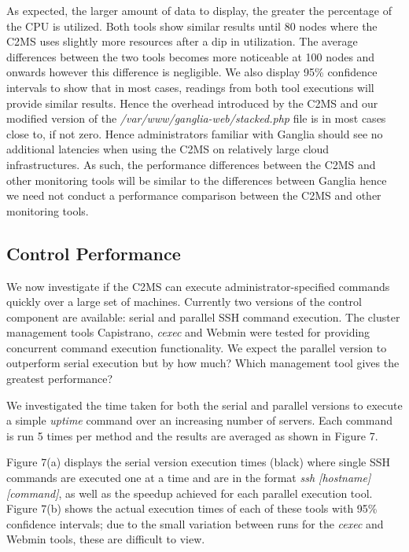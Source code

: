 \documentclass[10pt, conference, compsocconf]{IEEEtran}
\begin{document}
As expected, the larger amount of data to display, the greater the percentage of the CPU is utilized. Both tools show similar results until 80 nodes where the C2MS uses slightly more resources after a dip in utilization. The average differences between the two tools becomes more noticeable at 100 nodes and onwards however this difference is negligible. We also display 95\% confidence intervals to show that in most cases, readings from both tool executions will provide similar results. Hence the overhead introduced by the C2MS and our modified version of the \textit{/var/www/ganglia-web/stacked.php} file is in most cases close to, if not zero. Hence administrators familiar with Ganglia should see no additional latencies when using the C2MS on relatively large cloud infrastructures. As such, the performance differences between the C2MS and other monitoring tools will be similar to the differences between Ganglia hence we need not conduct a performance comparison between the C2MS and other monitoring tools. 

 \subsection{Control Performance}
We now investigate if the C2MS can execute administrator-specified commands quickly over a large set of machines. Currently two versions of the control component are available: serial and parallel SSH command execution. The cluster management tools Capistrano, \textit{cexec} and Webmin were tested for providing concurrent command execution functionality. We expect the parallel version to outperform serial execution but by how much? Which management tool gives the greatest performance?

We investigated the time taken for both the serial and parallel versions to execute a simple \textit{uptime} command over an increasing number of servers. Each command is run 5 times per method and the results are averaged as shown in Figure 7. 

Figure 7(a) displays the serial version execution times (black) where single SSH commands are executed one at a time and are in the format \textit{ssh [hostname] [command]}, as well as the speedup achieved for each parallel execution tool. Figure 7(b) shows the actual execution times of each of these tools with 95\% confidence intervals; due to the small variation between runs for the \textit{cexec} and Webmin tools, these are difficult to view.
\end{document}
